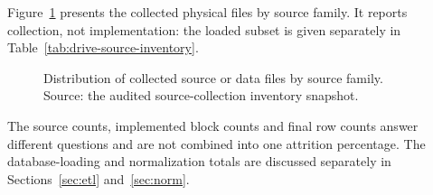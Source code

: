 Figure~\ref{fig:files-distribution} presents the collected physical files by
source family. It reports collection, not implementation: the loaded subset is
given separately in Table~\ref{tab:drive-source-inventory}.

\begin{figure}[H]
\centering
{}
\caption{Distribution of collected source or data files by source family.
Source: the audited source-collection inventory snapshot.}
\label{fig:files-distribution}
\end{figure}

The source counts, implemented block counts and final row counts answer
different questions and are not combined into one attrition percentage. The
database-loading and normalization totals are discussed separately in
Sections~\ref{sec:etl} and~\ref{sec:norm}.
